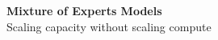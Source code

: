 \begin{frame}[plain]
    \centering
    \vspace{2.5cm}
    {\Huge \textbf{Mixture of Experts Models}}\\[1.5ex]
    {\large Scaling capacity without scaling compute}
\end{frame}
